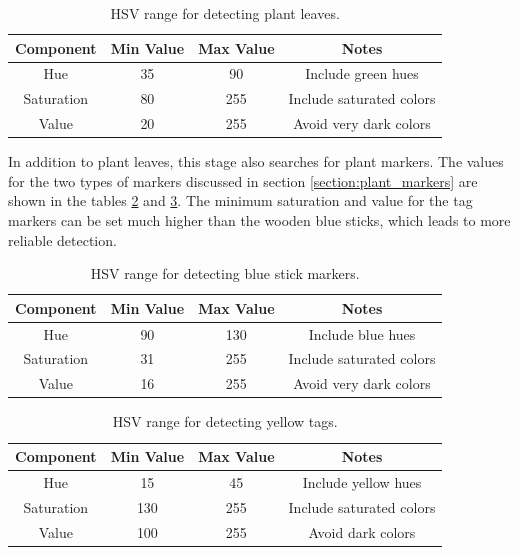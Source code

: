 \begin{table}
    \begin{center}
    \caption[Plant Leaf Detection Values]{HSV range for detecting plant leaves.}
    \begin{tabular}[c]{|c|c|c|c|}
        \hline
        Component & Min Value & Max Value & Notes \\
        \hline
        Hue        & 35  & 90  & Include green hues        \\
        Saturation & 80  & 255 & Include saturated colors  \\
        Value      & 20  & 255 & Avoid very dark colors    \\
        \hline
    \end{tabular}
    \label{table:plant_leaves_hsv_ranges}
   \end{center}
\end{table}

In addition to plant leaves, this stage also searches for plant markers.  The values for the two types of markers discussed in section \ref{section:plant_markers} are shown in the tables \ref{table:stick_hsv_ranges} and \ref{table:tag_ranges}.  The minimum saturation and value for the tag markers can be set much higher than the wooden blue sticks, which leads to more reliable detection.   

\begin{table}
    \begin{center}
    \caption[Blue Stick Detection Values]{HSV range for detecting blue stick markers.}
    \begin{tabular}[c]{|c|c|c|c|}
        \hline
        Component & Min Value & Max Value & Notes \\
        \hline
        Hue        & 90  & 130 & Include blue hues        \\
        Saturation & 31  & 255 & Include saturated colors  \\
        Value      & 16  & 255 & Avoid very dark colors    \\
        \hline
    \end{tabular}
    \label{table:stick_hsv_ranges}
   \end{center}
\end{table}

\begin{table}
    \begin{center}
    \caption[Yellow Tags Detection Values]{HSV range for detecting yellow tags.}
    \begin{tabular}[c]{|c|c|c|c|}
        \hline
        Component & Min Value & Max Value & Notes \\
        \hline
        Hue        & 15  & 45  & Include yellow hues       \\
        Saturation & 130 & 255 & Include saturated colors  \\
        Value      & 100 & 255 & Avoid dark colors         \\
        \hline
    \end{tabular}
    \label{table:tag_ranges}
   \end{center}
\end{table}

